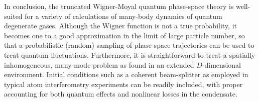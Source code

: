 \documentclass[aps,prl,twocolumn,showpacs,amsmath,amssymb,superscriptaddress,flushbottom,noraggedfooter]{revtex4-1}
\begin{document}
In conclusion, the truncated Wigner-Moyal quantum phase-space theory is
well-suited for a variety of calculations of many-body dynamics of quantum degenerate gases.
Although the Wigner function is not a true probability, it becomes one
to a good approximation in the limit of large particle number, so that
a probabilistic (random) sampling of phase-space trajectories can be used
to treat quantum fluctuations.
Furthermore, it is straightforward to treat a spatially inhomogeneous,
many-mode problem as found in an extended $D$-dimensional environment.
Initial conditions such as a coherent beam-splitter as employed in typical
atom interferometry experiments can be readily included,
with proper accounting for both quantum effects and nonlinear losses in the condensate.


\end{document}
